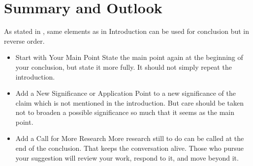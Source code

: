\chapter{Summary and Outlook}

As stated in \cite{Booth2003}, same elements as in Introduction can be used for
conclusion but in reverse order.
\begin{itemize}
\item Start with Your Main Point
State the main point again at the beginning of your conclusion, but state it
more fully. It should not simply repeat the introduction.
\item Add a New Significance or Application
Point to a new significance of the claim which is not mentioned in the
introduction. But care should be taken not to broaden a possible significance 
so much that it seems as the main point. 
\item Add a Call for More Research
More research still to do can be called at the end of the conclusion. That keeps
the conversation alive. Those who pursue your suggestion will review your work, respond to it, and move beyond it.
\end{itemize} 
